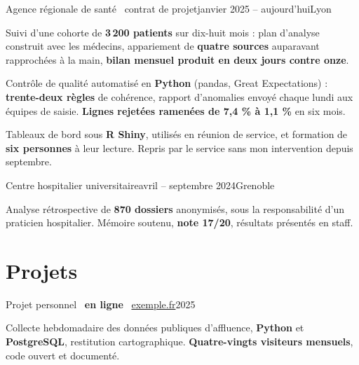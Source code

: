 \documentclass[10pt,a4paper]{article}
\begin{document}
      {Agence régionale de santé \textbullet\ contrat de projet}{janvier 2025 – aujourd'hui}{Lyon}
\begin{faits}
\item Suivi d'une cohorte de \textbf{3\,200 patients} sur dix-huit mois : plan d'analyse
construit avec les médecins, appariement de \textbf{quatre sources} auparavant rapprochées à la
main, \textbf{bilan mensuel produit en deux jours contre onze}.
\item Contrôle de qualité automatisé en \textbf{Python} (pandas, Great Expectations) :
\textbf{trente-deux règles} de cohérence, rapport d'anomalies envoyé chaque lundi aux équipes de
saisie. \textbf{Lignes rejetées ramenées de 7,4 \% à 1,1 \%} en six mois.
\item Tableaux de bord sous \textbf{R Shiny}, utilisés en réunion de service, et formation de
\textbf{six personnes} à leur lecture. Repris par le service sans mon intervention depuis
septembre.
\end{faits}

      {Centre hospitalier universitaire}{avril – septembre 2024}{Grenoble}
\begin{faits}
\item Analyse rétrospective de \textbf{870 dossiers} anonymisés, sous la responsabilité d'un
praticien hospitalier. Mémoire soutenu, \textbf{note 17/20}, résultats présentés en staff.
\end{faits}

\section{Projets}

      {Projet personnel \textbullet\ \textbf{en ligne} \textbullet\ \href{https://exemple.fr}{exemple.fr}}{2025}{}
\begin{faits}
\item Collecte hebdomadaire des données publiques d'affluence, \textbf{Python} et
\textbf{PostgreSQL}, restitution cartographique. \textbf{Quatre-vingts visiteurs mensuels},
code ouvert et documenté.
\end{faits}
\end{document}
